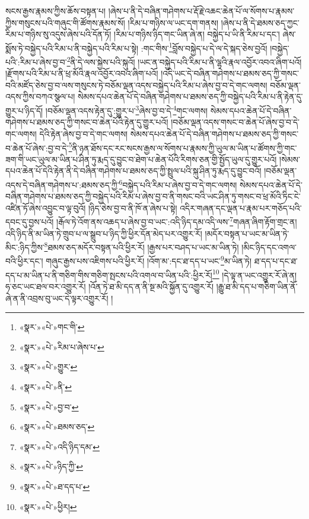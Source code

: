 སངས་རྒྱས་རྣམས་ཀྱིས་ཆོས་བསྟན་པ། །ཞེས་པ་ནི་དེ་བཞིན་གཤེགས་པ་རྡོ་རྗེ་འཆང་ཆེན་པོ་ལ་སོགས་པ་རྣམས་ཀྱིས་གསུངས་པའི་གཞུང་གི་ཚོགས་རྣམས་སོ། །རིམ་པ་གཉིས་ལ་ཡང་དག་གནས། །ཞེས་པ་ནི་དེ་ཐམས་ཅད་ཀྱང་རིམ་པ་གཉིས་སུ་འདུས་ཞེས་པའི་དོན་ཏོ། །རིམ་པ་གཉིས་ཉིད་གང་ཡིན་ཞེ་ན། བསྐྱེད་པ་ཡི་ནི་རིམ་པ་དང་། ཞེས་སྨོས་ཏེ་བསྐྱེད་པའི་རིམ་པ་ནི་བསྐྱེད་པའི་རིམ་པ་སྟེ། :གང་གིས་\footnote{«སྣར་»«པེ་»གང་གི་}བློས་བསྐྱེད་པ་དེ་ལ་དེ་སྐད་ཅེས་བྱའོ། །བསྐྱེད་པའི་:རིམ་པ་ཞེས་བྱ་བ་\footnote{«སྣར་»«པེ་»རིམ་པ་ཞེས་པ་}ནི་དེ་ལས་སྐྱེས་པའི་སྐུའོ། །ཡང་ན་བསྐྱེད་པའི་རིམ་པ་ནི་ལྷའི་རྣལ་འབྱོར་འབའ་ཞིག་པའོ། །རྫོགས་པའི་རིམ་པ་ནི་ཕྲ་མོའི་རྣལ་འབྱོར་འབའ་ཞིག་པའོ། །འདི་ཡང་དེ་བཞིན་གཤེགས་པ་ཐམས་ཅད་ཀྱི་གསང་བའི་མཛོད་ཅེས་བྱ་བ་ལས་གསུངས་ཏེ་བཅོམ་ལྡན་འདས་བསྐྱེད་པའི་རིམ་པ་ཞེས་བྱ་བ་དེ་གང་ལགས། བཅོམ་ལྡན་འདས་ཀྱིས་བཀའ་སྩལ་པ། སེམས་དཔའ་ཆེན་པོ་དེ་བཞིན་གཤེགས་པ་ཐམས་ཅད་ཀྱི་བསྐྱེད་པའི་རིམ་པ་ནི་རྟེན་དུ་གྱུར་པ་ཉིད་དོ། །བཅོམ་ལྡན་འདས་རྟེན་དུ་:གྱུར་པ་\footnote{«སྣར་»«པེ་»གྱུར་}ཞེས་བྱ་བ་དེ་\footnote{«སྣར་»«པེ་»ནི་}གང་ལགས། སེམས་དཔའ་ཆེན་པོ་དེ་བཞིན་གཤེགས་པ་ཐམས་ཅད་ཀྱི་གསང་བ་ཆེན་པོའི་རྟེན་དུ་གྱུར་པའོ། །བཅོམ་ལྡན་འདས་གསང་བ་ཆེན་པོ་ཞེས་བྱ་བ་དེ་གང་ལགས། དེའི་རྟེན་ཞེས་བྱ་བ་དེ་གང་ལགས། སེམས་དཔའ་ཆེན་པོ་དེ་བཞིན་གཤེགས་པ་ཐམས་ཅད་ཀྱི་གསང་བ་ཆེན་པོ་ཞེས་:བྱ་བ་དེ་\footnote{«སྣར་»«པེ་»བྱ་བ་}ནི་ཉན་ཐོས་དང་རང་སངས་རྒྱས་ལ་སོགས་པ་རྣམས་ཀྱི་ཡུལ་མ་ཡིན་པ་ཚོགས་ཀྱི་གང་ཟག་གི་ཡང་ཡུལ་མ་ཡིན་པ་ཤིན་ཏུ་རྨད་དུ་བྱུང་བ་ཐེག་པ་ཆེན་པོའི་རིགས་ཅན་གྱི་སྤྱོད་ཡུལ་དུ་གྱུར་པའོ། །སེམས་དཔའ་ཆེན་པོ་དེའི་རྟེན་ནི་དེ་བཞིན་གཤེགས་པ་ཐམས་ཅད་ཀྱི་སྤྲུལ་པའི་སྐུ་ཤིན་ཏུ་རྨད་དུ་བྱུང་བའོ། །བཅོམ་ལྡན་འདས་དེ་བཞིན་གཤེགས་པ་:ཐམས་ཅད་ཀྱི་\footnote{«སྣར་»«པེ་»ཐམས་ཅད་}བསྐྱེད་པའི་རིམ་པ་ཞེས་བྱ་བ་དེ་གང་ལགས། སེམས་དཔའ་ཆེན་པོ་དེ་བཞིན་གཤེགས་པ་ཐམས་ཅད་ཀྱི་བསྐྱེད་པའི་རིམ་པ་ཞེས་བྱ་བ་ནི་གསང་བའི་ཡང་ཤིན་ཏུ་གསང་བ་ཕྲ་མོའི་ཏིང་ངེ་འཛིན་ཏོ་ཞེས་འབྱུང་བ་ལྟ་བུའོ། །ཉིད་ཅེས་བྱ་བ་ནི་ཁོ་ན་ཞེས་པ་སྟེ། འདིར་གཞན་དང་ལྡན་པ་རྣམ་པར་གཅོད་པའི་དབང་དུ་བྱས་པའོ། །རྒོལ་ཏེ་འོག་ནས་འཆད་པ་ཞེས་བྱ་བ་ཡང་:འདི་ཉིད་དམ་འདི་ལས་\footnote{«སྣར་»«པེ་»འདི་ཉིད་དམ་}གཞན་ཞིག་རྟོག་གྲང་ན། འདི་ཉིད་ནི་མ་ཡིན་ཏེ་གྲུབ་པ་ལ་སྒྲུབ་པ་ཉིད་ཀྱི་ཕྱིར་དོན་མེད་པར་འགྱུར་རོ། །མདོར་བསྟན་པ་ཡང་མ་ཡིན་ཏེ་མིང་:ཉིད་ཀྱིས་\footnote{«སྣར་»«པེ་»ཉིད་ཀྱི་}ཐམས་ཅད་མདོར་བསྟན་པའི་ཕྱིར་རོ། །རྒྱས་པར་བཤད་པ་ཡང་མ་ཡིན་ཏེ། །མིང་ཉིད་དང་འགལ་བའི་ཕྱིར་དང་། གཞུང་རྒྱས་པས་འཇིགས་པའི་ཕྱིར་རོ། །འོག་མ་:དང་ཐ་དད་པ་ཡང་\footnote{«སྣར་»«པེ་»ཐ་དད་པ་}མ་ཡིན་ཏེ། ཐ་དད་པ་དང་ཐ་དད་པ་མ་ཡིན་པ་ནི་གཅིག་གིས་གཅིག་སྤངས་པའི་འགལ་བ་ཡིན་པའི་:ཕྱིར་རོ།\footnote{«སྣར་»«པེ་»ཕྱིར།} །དེ་ལྟ་ན་ཡང་འགྱུར་རོ་ཞེ་ན། ཧ་ཅང་ཡང་ཐལ་བར་འགྱུར་རོ། །འོན་ཏེ་ཐ་མི་དད་ན་ནི་སྔ་མའི་སྐྱོན་དུ་འགྱུར་རོ། །རྒྱུ་ཐ་མི་དད་པ་གཅིག་ཡིན་ནོ་ཞེ་ན་ནི་འབྲས་བུ་ཡང་དེ་ལྟར་འགྱུར་རོ། །
